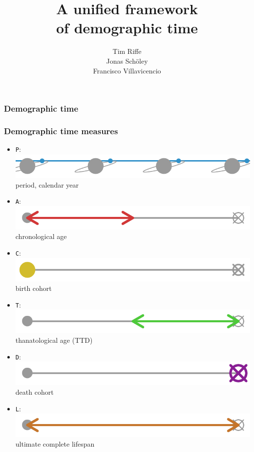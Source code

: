 \documentclass[20pt]{beamer}
\title{A unified framework\\ of demographic time}
\subtitle{Tim Riffe \\ Jonas Sch{\"o}ley \\ Francisco Villavicencio}		%
\begin{document}

\begin{frame}
	\titlepage
\end{frame}
\begin{frame}
\frametitle{Demographic time}
\end{frame}
\begin{frame}
\frametitle{Demographic time measures}
\begin{itemize}[<+->]
  \item \texttt{P}: \includegraphics[scale=.5]{Figures/llP.pdf} 
  \hspace{2em}period, calendar year
  \item \texttt{A}: \includegraphics[scale=.5]{Figures/llA.pdf}
  \hspace{2em}chronological age
  \item \texttt{C}: \includegraphics[scale=.5]{Figures/llC.pdf}
  \hspace{2em}birth cohort
  \item \texttt{T}: \includegraphics[scale=.5]{Figures/llT.pdf}
  \hspace{2em}thanatological age (TTD)
  \item \texttt{D}: \includegraphics[scale=.5]{Figures/llD.pdf}
  \hspace{2em}death cohort
  \item \texttt{L}: \includegraphics[scale=.5]{Figures/llL.pdf}
  \hspace{2em}ultimate complete lifespan
\end{itemize}
\end{frame}
\end{document}

